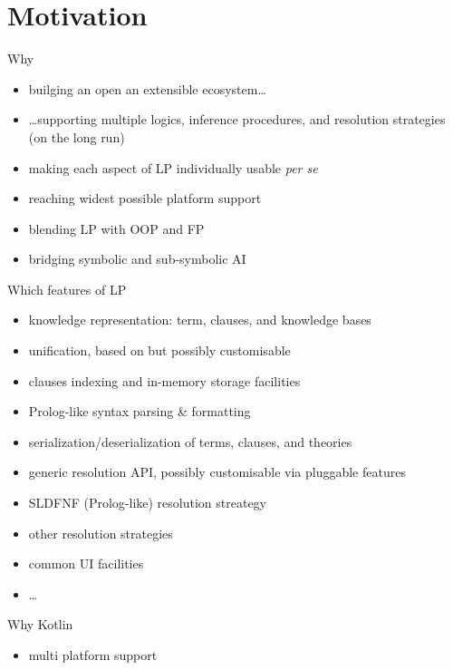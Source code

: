 \documentclass[presentation]{beamer}
\begin{document}
\section{Motivation}

\begin{frame}{Why \twopkt{}}
    \begin{itemize}
        \item builging an open an extensible ecosystem\ldots
        \item \ldots supporting multiple logics, inference procedures, and resolution strategies (on the long run)
        \item making each aspect of LP individually usable \emph{per se}
        \item reaching widest possible platform support 
        \item blending LP with OOP and FP
        \item bridging symbolic and sub-symbolic AI
    \end{itemize}
\end{frame}

\begin{frame}{Which features of LP}
    \begin{itemize}
        \item knowledge representation: term, clauses, and knowledge bases
        \item unification, based on \cite{MartelliMontanari1982} but possibly customisable
        \item clauses indexing and in-memory storage facilities
        \item Prolog-like syntax parsing \& formatting
        \item serialization/deserialization of terms, clauses, and theories
        \item generic resolution API, possibly customisable via pluggable features
        \item SLDFNF (Prolog-like) resolution streategy
        \item other resolution strategies
        \item common UI facilities
        \item \ldots
    \end{itemize}
\end{frame}

\begin{frame}{Why Kotlin}
    \begin{itemize}
        \item multi platform support
    \end{itemize}
\end{frame}
\end{document}
